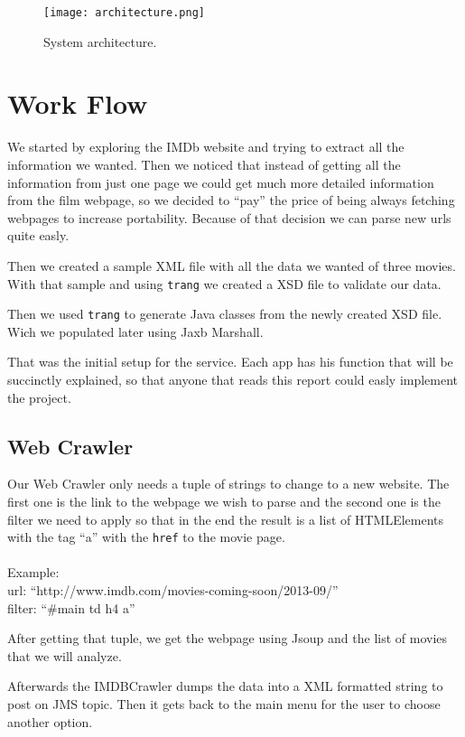 \documentclass[a4paper]{article}
\begin{document}
\begin{figure}[h!]
	\centering
	\texttt{[image: architecture.png]}
	\caption{System architecture.}
\end{figure}
\clearpage


\section{Work Flow}
\indent \indent We started by exploring the IMDb website and trying to extract all the information we wanted. Then we noticed that instead of getting all the information from just one page we could get much more detailed information from the film webpage, so we decided to ``pay'' the price of being always fetching webpages to increase portability. Because of that decision we can parse new urls quite easly.

Then we created a sample XML file with all the data we wanted of three movies. With that sample and using \texttt{trang} we created a XSD file to validate our data.

Then we used \texttt{trang} to generate Java classes from the newly created XSD file. Wich we populated later using Jaxb Marshall.

That was the initial setup for the service. Each app has his function that will be succinctly explained, so that anyone that reads this report could easly implement the project.

\subsection{Web Crawler}
\indent \indent Our Web Crawler only needs a tuple of strings to change to a new website. The first one is the link to the webpage we wish to parse and the second one is the filter we need to apply so that in the end the result is a list of HTMLElements with the tag ``a'' with the \texttt{href} to the movie page.\\
\\Example:\\url: ``http://www.imdb.com/movies-coming-soon/2013-09/''\\filter: ``\#main td h4 a''

After getting that tuple, we get the webpage using Jsoup and the list of movies that we will analyze.

Afterwards the IMDBCrawler dumps the data into a XML formatted string to post on JMS topic. Then it gets back to the main menu for the user to choose another option.
\end{document}
